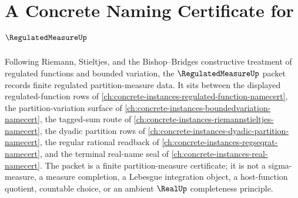 \chapter{A Concrete Naming Certificate for $\RegulatedMeasureUp$}
\label{ch:concrete-instances-regulated-measure-namecert}

Following Riemann, Stieltjes, and the Bishop--Bridges constructive treatment of regulated functions and bounded variation, the $\RegulatedMeasureUp$ packet records finite regulated partition-measure data. It sits between the displayed regulated-function rows of \autoref{ch:concrete-instances-regulated-function-namecert}, the partition-variation surface of \autoref{ch:concrete-instances-boundedvariation-namecert}, the tagged-sum route of \autoref{ch:concrete-instances-riemannstieltjes-namecert}, the dyadic partition rows of \autoref{ch:concrete-instances-dyadic-partition-namecert}, the regular rational readback of \autoref{ch:concrete-instances-regseqrat-namecert}, and the terminal real-name seal of \autoref{ch:concrete-instances-real-namecert}. The packet is a finite partition-measure certificate; it is not a sigma-measure, a measure completion, a Lebesgue integration object, a host-function quotient, countable choice, or an ambient $\RealUp$ completeness principle.

